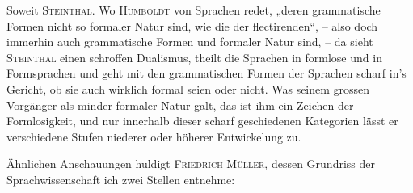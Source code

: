 Soweit \textsc{Steinthal}. Wo \textsc{Humboldt} von Sprachen redet, „deren grammatische Formen nicht so formaler Natur sind, wie die der flectirenden“, – also doch immerhin auch grammatische Formen und formaler Natur sind, – da sieht \textsc{Steinthal} einen schroffen Dualismus, theilt die Sprachen in formlose und in Formsprachen und geht mit den grammatischen Formen der Sprachen scharf in’s Gericht, ob sie auch wirklich formal seien oder nicht. Was seinem grossen Vorgänger als  minder formaler Natur galt, das ist ihm ein Zeichen der Formlosigkeit, und nur innerhalb dieser  scharf geschiedenen Kategorien lässt er verschiedene Stufen niederer oder höherer Entwickelung zu.

Ähnlichen Anschauungen huldigt \textsc{Friedrich Müller}, dessen Grundriss der Sprachwissenschaft ich zwei Stellen entnehme:

\label{fp.325}

